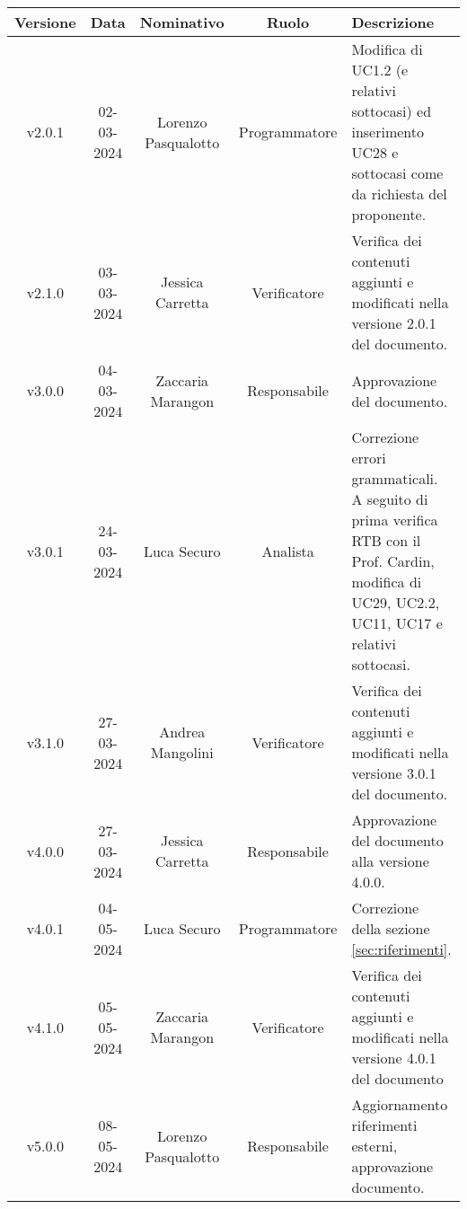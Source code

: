     \begin{table}[H]
        \centering
        \renewcommand\tabularxcolumn[1]{m{#1}} %
        \renewcommand{\arraystretch}{1.5}
        \begin{tabularx}{0.98\textwidth}
            {c|c|c|c|>{\centering\arraybackslash}X}
            \rowcolor{black}
            \textbf{\color{white} Versione} & \textbf{\color{white} Data} & \textbf{\color{white} Nominativo} & \textbf{\color{white} Ruolo} & \textbf{\color{white} Descrizione} \\ 
            \hline
            v2.0.1 & 02-03-2024 & Lorenzo Pasqualotto & Programmatore & Modifica di UC1.2 (e relativi sottocasi) ed inserimento UC28 e sottocasi come da richiesta del proponente.\\
            v2.1.0 & 03-03-2024 & Jessica Carretta & Verificatore & Verifica dei contenuti aggiunti e modificati nella versione 2.0.1 del documento.\\
            v3.0.0 & 04-03-2024 & Zaccaria Marangon & Responsabile & Approvazione del documento.\\
            v3.0.1 & 24-03-2024 & Luca Securo & Analista & Correzione errori grammaticali. A seguito di prima verifica RTB con il Prof. Cardin, modifica di UC29, UC2.2, UC11, UC17 e relativi sottocasi.\\
            v3.1.0 & 27-03-2024 & Andrea Mangolini & Verificatore & Verifica dei contenuti aggiunti e modificati nella versione 3.0.1 del documento.\\
            v4.0.0 & 27-03-2024 & Jessica Carretta & Responsabile & Approvazione del documento alla versione 4.0.0.\\
            v4.0.1 & 04-05-2024 & Luca Securo & Programmatore & Correzione della sezione \ref{sec:riferimenti}.\\
            v4.1.0 & 05-05-2024 & Zaccaria Marangon & Verificatore & Verifica dei contenuti aggiunti e modificati nella versione 4.0.1 del documento\\
            v5.0.0 & 08-05-2024 & Lorenzo Pasqualotto & Responsabile & Aggiornamento riferimenti esterni, approvazione documento.\\
            \hline
        \end{tabularx}
    \end{table}